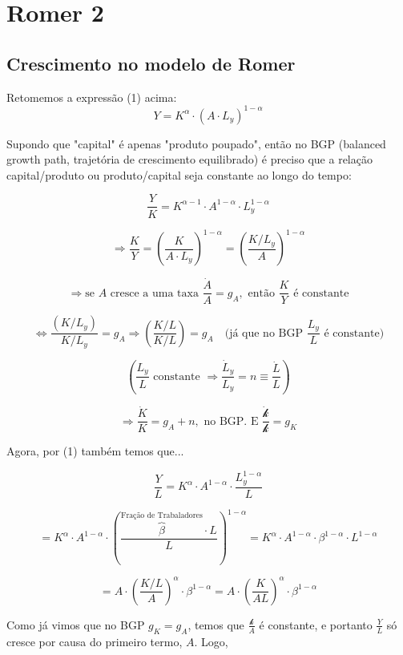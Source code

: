 \documentclass[a4paper,12pt]{article}[abntex2]
\begin{document}
\newpage
\section{\textbf{Romer 2}}
\subsection{\textbf{Crescimento no modelo de Romer}}

Retomemos a expressão (1) acima:
\[
Y = K^\alpha \cdot (A \cdot L_y)^{1 - \alpha}
\]

Supondo que "capital" é apenas "produto poupado", então no BGP (balanced growth path, trajetória de crescimento equilibrado) é preciso que a relação capital/produto ou produto/capital seja constante ao longo do tempo:

\[
\frac{Y}{K} = K^{\alpha - 1} \cdot A^{1 - \alpha} \cdot L_y^{1 - \alpha}
\]

\[
\Rightarrow \frac{K}{Y} = \left( \frac{K}{A \cdot L_y} \right)^{1 - \alpha} = \left( \frac{K / L_y}{A} \right)^{1 - \alpha}
\]

\[
\Rightarrow \text{se } A \text{ cresce a uma taxa } \frac{\dot{A}}{A} = g_A, \text{ então } \frac{K}{Y} \text{ é constante}
\]

\[
\Leftrightarrow \frac{(K / L_y)}{K / L_y} = g_A \Rightarrow \left( \frac{K / L}{K / L} \right) = g_A \quad \text{(já que no BGP } \frac{L_y}{L} \text{ é constante)}
\]

\[
\left( \frac{L_y}{L} \text{ constante } \Rightarrow \frac{\dot{L}_y}{L_y} = n \equiv \frac{\dot{L}}{L} \right)
\]

\[
\Rightarrow \frac{\dot{K}}{K} = g_A + n, \text{ no BGP. E } \frac{\dot{\mathcal{k}}}{\mathcal{k}} = g_K
\]

Agora, por (1) também temos que...

\[
\frac{Y}{L} = K^\alpha \cdot A^{1 - \alpha} \cdot \frac{L_y^{1 - \alpha}}{L}
\]

\[
= K^\alpha \cdot A^{1 - \alpha} \cdot \left( \frac{\overbrace{\beta}^\text{Fração de Trabaladores} \cdot L}{L} \right)^{1 - \alpha}
= K^\alpha \cdot A^{1 - \alpha} \cdot \beta^{1 - \alpha} \cdot L^{1 - \alpha}
\]

\[
= A \cdot \left( \frac{K / L}{A} \right)^\alpha \cdot \beta^{1 - \alpha}
= A \cdot \left( \frac{K}{A L} \right)^\alpha \cdot \beta^{1 - \alpha}
\]

Como já vimos que no BGP \( g_K = g_A \), temos que \( \frac{\mathcal{k}}{A} \) é constante, e portanto \( \frac{Y}{L} \) só cresce por causa do primeiro termo, \( A \). Logo,
\end{document}
